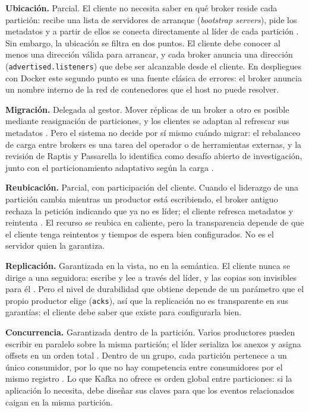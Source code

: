 \documentclass[11pt,a4paper]{article}
\begin{document}
\textbf{Ubicación.} Parcial. El cliente no necesita saber en qué broker reside cada partición: recibe una lista de servidores de arranque (\emph{bootstrap servers}), pide los metadatos y a partir de ellos se conecta directamente al líder de cada partición \cite{kafkadocs}. Sin embargo, la ubicación se filtra en dos puntos. El cliente debe conocer al menos una dirección válida para arrancar, y cada broker anuncia una dirección (\texttt{advertised.listeners}) que debe ser alcanzable desde el cliente. En despliegues con Docker este segundo punto es una fuente clásica de errores: el broker anuncia un nombre interno de la red de contenedores que el host no puede resolver.

\textbf{Migración.} Delegada al gestor. Mover réplicas de un broker a otro es posible mediante reasignación de particiones, y los clientes se adaptan al refrescar sus metadatos \cite{kafkadocs}. Pero el sistema no decide por sí mismo cuándo migrar: el rebalanceo de carga entre brokers es una tarea del operador o de herramientas externas, y la revisión de Raptis y Passarella lo identifica como desafío abierto de investigación, junto con el particionamiento adaptativo según la carga \cite{raptis2023survey}.

\textbf{Reubicación.} Parcial, con participación del cliente. Cuando el liderazgo de una partición cambia mientras un productor está escribiendo, el broker antiguo rechaza la petición indicando que ya no es líder; el cliente refresca metadatos y reintenta \cite{kafkadocs}. El recurso se reubica en caliente, pero la transparencia depende de que el cliente tenga reintentos y tiempos de espera bien configurados. No es el servidor quien la garantiza.

\textbf{Replicación.} Garantizada en la vista, no en la semántica. El cliente nunca se dirige a una seguidora: escribe y lee a través del líder, y las copias son invisibles para él \cite{raptis2023survey}. Pero el nivel de durabilidad que obtiene depende de un parámetro que el propio productor elige (\texttt{acks}), así que la replicación no es transparente en sus garantías: el cliente debe saber que existe para configurarla bien.

\textbf{Concurrencia.} Garantizada dentro de la partición. Varios productores pueden escribir en paralelo sobre la misma partición; el líder serializa los anexos y asigna offsets en un orden total \cite{raptis2023survey}. Dentro de un grupo, cada partición pertenece a un único consumidor, por lo que no hay competencia entre consumidores por el mismo registro \cite{kafkadocs}. Lo que Kafka no ofrece es orden global entre particiones: si la aplicación lo necesita, debe diseñar sus claves para que los eventos relacionados caigan en la misma partición.
\end{document}
